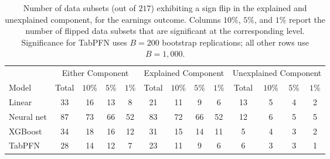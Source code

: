 \begin{table}[!ht]
    \caption{Number of data subsets (out of $217$) exhibiting a sign flip in the explained and unexplained component, for the earnings outcome. Columns $10\%$, $5\%$, and $1\%$ report the number of flipped data subsets that are significant at the corresponding level. Significance for TabPFN uses $B = 200$ bootstrap replications; all other rows use $B = 1{,}000$.} %
    \label{tab:flips_census_income}
    \centering
    \small
    \begin{tabular}{l*{12}{c}}
    \toprule
          & \multicolumn{4}{c}{Either Component} & \multicolumn{4}{c}{Explained Component} & \multicolumn{4}{c}{Unexplained Component} \\
          \cmidrule(lr){2-5} \cmidrule(lr){6-9} \cmidrule(lr){10-13}
    Model       & Total & $10\%$ & $5\%$ & $1\%$ & Total & $10\%$ & $5\%$ & $1\%$ & Total & $10\%$ & $5\%$ & $1\%$ \\
    \midrule
    Linear      & 33 & 16 & 13 & 8 & 21 & 11 & 9 & 6 & 13 & 5 & 4 & 2 \\
    Neural net & 87 & 73 & 66 & 52 & 83 & 72 & 66 & 52 & 12 & 6 & 5 & 5 \\
    XGBoost    & 34 & 18 & 16 & 12 & 31 & 15 & 14 & 11 & 5 & 4 & 3 & 2 \\
    TabPFN     & 28 & 14 & 12 & 7 & 23 & 11 & 9 & 6 & 6 & 3 & 3 & 1 \\
    \bottomrule
    \end{tabular}
\end{table}


